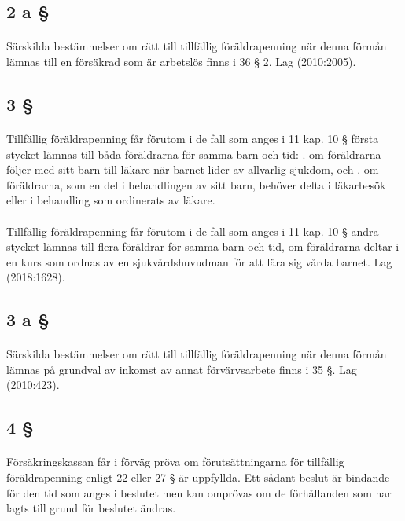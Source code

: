 \documentclass[a4paper,notitlepage,openany,10pt]{book}
\begin{document}
\subsection*{2 a §}
\paragraph*{}
Särskilda bestämmelser om rätt till tillfällig föräldrapenning när denna förmån lämnas till en försäkrad som är arbetslös finns i 36 § 2.
Lag (2010:2005).
\subsection*{3 §}
\paragraph*{}
Tillfällig föräldrapenning får förutom i de fall som anges i 11 kap. 10 § första stycket lämnas till båda föräldrarna för samma barn och tid:
. om föräldrarna följer med sitt barn till läkare när barnet lider av allvarlig sjukdom, och
. om föräldrarna, som en del i behandlingen av sitt barn, behöver delta i läkarbesök eller i behandling som ordinerats av läkare.
\paragraph*{}
Tillfällig föräldrapenning får förutom i de fall som anges i 11 kap. 10 § andra stycket lämnas till flera föräldrar för samma barn och tid, om föräldrarna deltar i en kurs som ordnas av en sjukvårdshuvudman för att lära sig vårda barnet.
Lag (2018:1628).
\subsection*{3 a §}
\paragraph*{}
Särskilda bestämmelser om rätt till tillfällig föräldrapenning när denna förmån lämnas på grundval av inkomst av annat förvärvsarbete finns i 35 §.
Lag (2010:423).
\subsection*{4 §}
\paragraph*{}
Försäkringskassan får i förväg pröva om förutsättningarna för tillfällig föräldrapenning enligt 22 eller 27 § är uppfyllda. Ett sådant beslut är bindande för den tid som anges i beslutet men kan omprövas om de förhållanden som har lagts till grund för beslutet ändras.
\end{document}
